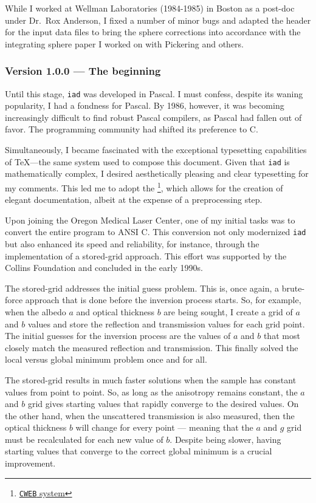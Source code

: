 \documentclass{article}
\newcommand\iadprog{\texttt{iad}}
\begin{document}
While I worked at Wellman Laboratories (1984-1985) in Boston as a post-doc under Dr.\ Rox Anderson, 
I fixed a number of minor bugs and adapted the header for the input data files to bring the sphere
corrections into accordance with the integrating sphere paper I worked on with Pickering and
others.  

\subsubsection*{Version 1.0.0 --- The beginning}

Until this stage, \iadprog{} was developed in Pascal. I must confess, despite its waning popularity, I had a fondness for Pascal. By 1986, however, it was becoming increasingly difficult to find robust Pascal compilers, as Pascal had fallen out of favor. The programming community had shifted its preference to C.

Simultaneously, I became fascinated with the exceptional typesetting capabilities of \TeX{}---the same system used to compose this document. Given that \iadprog{} is mathematically complex, I desired aesthetically pleasing and clear typesetting for my comments. This led me to adopt the \footnote{\href{https://github.com/ascherer/cwebbin}{\texttt{CWEB} system}}, which allows for the creation of elegant documentation, albeit at the expense of a preprocessing step.

Upon joining the Oregon Medical Laser Center, one of my initial tasks was to convert the entire program to ANSI C. This conversion not only modernized \iadprog{} but also enhanced its speed and reliability, for instance, through the implementation of a stored-grid approach. This effort was supported by the Collins Foundation and concluded in the early 1990s.

The stored-grid addresses the initial guess problem.  This is, once again, a
brute-force approach that is done before the inversion process starts. So, for example, when the albedo $a$ and optical thickness
$b$ are being sought, I create a grid of $a$ and $b$ values and store the reflection 
and transmission values for each grid point. The initial guesses for the inversion process are
the values of $a$ and $b$ that most closely match the measured reflection and transmission.  This finally solved the local versus global minimum problem once and for all.

The stored-grid results in much faster solutions when the sample has constant
values from point to point.  So, as long as the anisotropy remains constant, the $a$ and $b$
grid gives starting values that rapidly converge to the desired values.  On the other
hand, when the unscattered transmission is also measured, then the optical thickness
$b$ will change for every point --- meaning that the $a$ and $g$ grid must be recalculated
for each new value of $b$.  Despite being slower, having starting values that 
converge to the correct global minimum is a crucial improvement.
\end{document}
